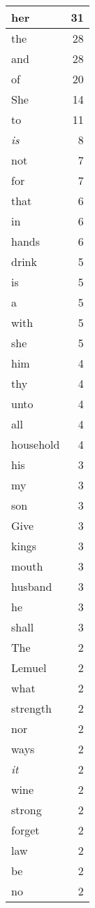 \begin{center}
\begin{longtable}{l|r}
her & 31\\ \hline 
the & 28\\ \hline 
and & 28\\ \hline 
of & 20\\ \hline 
She & 14\\ \hline 
to & 11\\ \hline 
\emph{is} & 8\\ \hline 
not & 7\\ \hline 
for & 7\\ \hline 
that & 6\\ \hline 
in & 6\\ \hline 
hands & 6\\ \hline 
drink & 5\\ \hline 
is & 5\\ \hline 
a & 5\\ \hline 
with & 5\\ \hline 
she & 5\\ \hline 
him & 4\\ \hline 
thy & 4\\ \hline 
unto & 4\\ \hline 
all & 4\\ \hline 
household & 4\\ \hline 
his & 3\\ \hline 
my & 3\\ \hline 
son & 3\\ \hline 
Give & 3\\ \hline 
kings & 3\\ \hline 
mouth & 3\\ \hline 
husband & 3\\ \hline 
he & 3\\ \hline 
shall & 3\\ \hline 
The & 2\\ \hline 
Lemuel & 2\\ \hline 
what & 2\\ \hline 
strength & 2\\ \hline 
nor & 2\\ \hline 
ways & 2\\ \hline 
\emph{it} & 2\\ \hline 
wine & 2\\ \hline 
strong & 2\\ \hline 
forget & 2\\ \hline 
law & 2\\ \hline 
be & 2\\ \hline 
no & 2\\ \hline 

\end{longtable}
\end{center}
